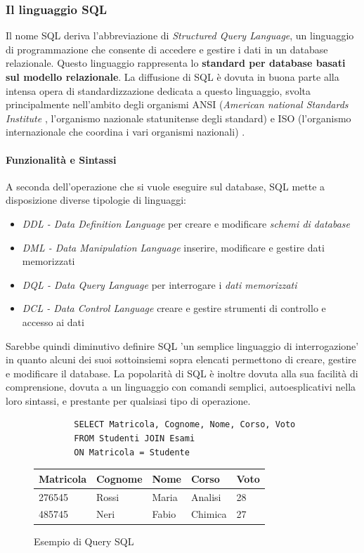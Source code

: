 \subsubsection{Il linguaggio SQL}
Il nome SQL deriva l’abbreviazione di \textit{Structured Query Language}, un linguaggio di programmazione che consente di accedere e gestire i dati in un database relazionale. Questo linguaggio rappresenta lo \textbf{standard per database basati sul modello relazionale}. La diffusione di SQL è dovuta in buona parte alla intensa opera di standardizzazione dedicata a questo linguaggio, svolta principalmente nell'ambito degli organismi ANSI (\textit{American national Standards Institute} \cite{site:ansi}, l'organismo nazionale statunitense degli standard) e ISO (l'organismo internazionale che coordina i vari organismi nazionali) \cite{site:iso}.

\paragraph{Funzionalità e Sintassi} A seconda dell'operazione che si vuole eseguire sul database, SQL mette a disposizione diverse tipologie di linguaggi:
\begin{itemize}
    \item \textit{DDL - Data Definition Language} per creare e modificare \emph{schemi di database}
    \item \textit{DML - Data Manipulation Language} inserire, modificare e gestire dati memorizzati
    \item \textit{DQL - Data Query Language} per interrogare i \emph{dati memorizzati}
    \item \textit{DCL - Data Control Language} creare e gestire strumenti di controllo e accesso ai dati
\end{itemize}
Sarebbe quindi diminutivo definire SQL 'un semplice linguaggio di interrogazione' in quanto alcuni dei suoi sottoinsiemi sopra elencati permettono di creare, gestire e modificare il database. La popolarità di SQL è inoltre dovuta alla sua facilità di comprensione, dovuta a un linguaggio con comandi semplici, autoesplicativi nella loro sintassi, e prestante per qualsiasi tipo di operazione.
\begin{figure}[H]
    \centering
    \begin{verbatim}
        SELECT Matricola, Cognome, Nome, Corso, Voto 
        FROM Studenti JOIN Esami 
        ON Matricola = Studente
    \end{verbatim}
    \begin{table}[H]
        \centering
        \begin{tabular}{ |p{2cm}||p{2cm}|p{2cm}|p{2cm}|p{2cm}|  }
            \hline
            Matricola & Cognome & Nome  & Corso   & Voto \\
            \hline
            276545    & Rossi   & Maria & Analisi & 28   \\
            485745    & Neri    & Fabio & Chimica & 27   \\
            \hline
        \end{tabular}
    \end{table}
    \caption{Esempio di Query SQL}
    \label{fig:sql-example}
\end{figure}

